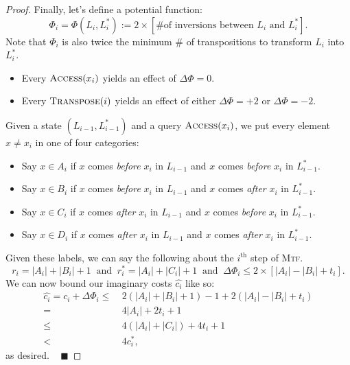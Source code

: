 \begin{proof}
    Finally, let's define a potential function:
    \[ \Phi_i = \Phi(L_i, L_i^*) := 2 \times [ \text{\# of inversions between $L_i$ and $L_i^*$} ]. \]
    Note that $\Phi_i$ is also twice the minimum \# of transpositions to transform $L_i$ into $L_i^*$.
    \begin{itemize}
        \item Every $\textsc{Access}(x_i)$ yields an effect of $\Delta \Phi = 0$.
        \item Every $\textsc{Transpose}(i)$ yields an effect of either $\Delta \Phi = +2$ or $\Delta \Phi = -2$.
    \end{itemize}
    Given a state $(L_{i - 1}, L_{i - 1}^*)$ and a query $\textsc{Access}(x_i)$, we put every element $x \neq x_i$ in one of four categories:
    \begin{itemize}
        \item Say $x \in A_i$ if $x$ comes \emph{before} $x_i$ in $L_{i - 1}$ and $x$ comes \emph{before} $x_i$ in $L_{i - 1}^*$.
        \item Say $x \in B_i$ if $x$ comes \emph{before} $x_i$ in $L_{i - 1}$ and $x$ comes \emph{after} $x_i$ in $L_{i - 1}^*$.
        \item Say $x \in C_i$ if $x$ comes \emph{after} $x_i$ in $L_{i - 1}$ and $x$ comes \emph{before} $x_i$ in $L_{i - 1}^*$.
        \item Say $x \in D_i$ if $x$ comes \emph{after} $x_i$ in $L_{i - 1}$ and $x$ comes \emph{after} $x_i$ in $L_{i - 1}^*$.
    \end{itemize}
    Given these labels, we can say the following about the $i^{\text{th}}$ step of \textsc{Mtf}.
    \[ r_i = |A_i| + |B_i| + 1 ~ \text{ and } ~ r_i^* = |A_i| + |C_i| + 1 ~ \text{ and } ~ \Delta \Phi_i \leq 2 \times [|A_i| - |B_i| + t_i]. \]
    We can now bound our imaginary costs $\hat{c_i}$ like so:
    \begin{align*}
        \hat{c_i} = c_i+ \Delta \Phi_i \leq \ & 2(|A_i| + |B_i| + 1) - 1 + 2(|A_i| - |B_i| + t_i) \\
        = \ & 4|A_i| + 2t_i + 1 \\
        \leq \ & 4(|A_i| + |C_i|) + 4t_i + 1 \\
        < \ & 4c_i^*,
    \end{align*}
    as desired. ~ $\blacksquare$
\end{proof}

